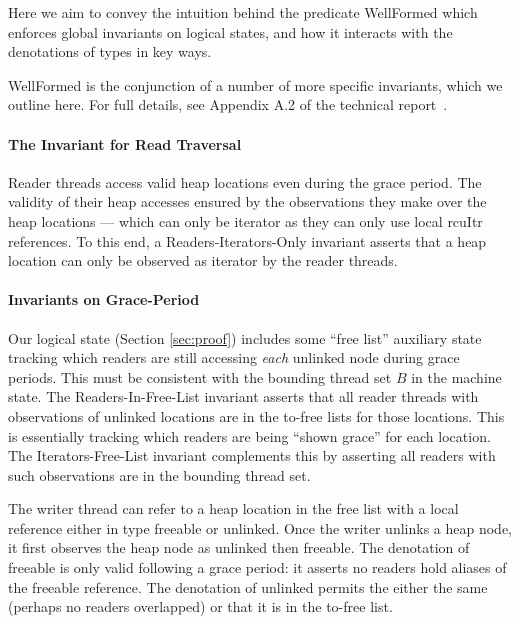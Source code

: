 \label{sec:lemmas} Here we aim to convey the intuition behind the predicate \textsf{WellFormed} which enforces global invariants on logical states, and how it interacts with the denotations of types in key ways.

\textsf{WellFormed} is the conjunction of a number of more specific invariants, which we outline here.
For full details, see Appendix A.2 of the technical report~\cite{isotek}.

\paragraph{The Invariant for Read Traversal} Reader threads access valid heap locations even during the grace period. The validity of their heap accesses ensured by the observations they make over the heap locations --- which can only be \textsf{iterator} as they can only use local \textsf{rcuItr} references. To this end, a \textsf{Readers-Iterators-Only} invariant asserts that a heap location can only be observed as \textsf{iterator} by the reader threads.
\paragraph{Invariants on Grace-Period}
Our logical state (Section \ref{sec:proof}) includes some ``free list'' auxiliary state tracking which readers are still accessing \emph{each} unlinked node during grace periods. This must be consistent with the bounding thread set $B$ in the machine state.
The \textsf{Readers-In-Free-List} invariant 
asserts that all reader threads with observations of unlinked locations are in the to-free lists for those locations.
This is essentially tracking which readers are being ``shown grace'' for each location.
The \textsf{Iterators-Free-List} invariant complements this by asserting all readers with such observations are in the bounding thread set.

The writer thread can refer to a heap location in the free list with a local reference either in type \textsf{freeable} or \textsf{unlinked}. Once the writer unlinks a heap node, it first observes the heap node as \textsf{unlinked} then \textsf{freeable}. The denotation of \textsf{freeable} is only valid following a grace period: it asserts no readers hold aliases of the \textsf{freeable} reference. The denotation of \textsf{unlinked} permits the either the same (perhaps no readers overlapped) 
or that it is in the to-free list.
